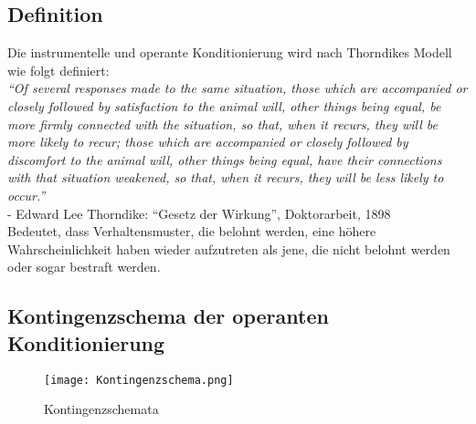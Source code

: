 	\newpage

		\subsection{Definition}
		
Die instrumentelle und operante Konditionierung wird nach Thorndikes Modell wie folgt definiert: \\
\textit{“Of several responses made to the same situation, those which are accompanied or closely followed by satisfaction to the animal will, other things being equal, be more firmly connected with the situation, so that, when it recurs, they will be more likely to recur; those which are accompanied or closely followed by discomfort to the animal will, other things being equal, have their connections with that situation weakened, so that, when it recurs, they will be less likely to occur.”} \\
- Edward Lee Thorndike: “Gesetz der Wirkung”, Doktorarbeit, 1898 \\
Bedeutet, dass Verhaltensmuster, die belohnt werden, eine höhere Wahrscheinlichkeit haben wieder aufzutreten als jene, die nicht belohnt werden oder sogar bestraft werden. 


		\subsection{Kontingenzschema der operanten Konditionierung}
		
\begin{center}
\begin{figure}[h]
    \centering
    \texttt{[image: Kontingenzschema.png]}
    \caption{Kontingenzschemata}
		\end{figure}
		\end{center}
		
